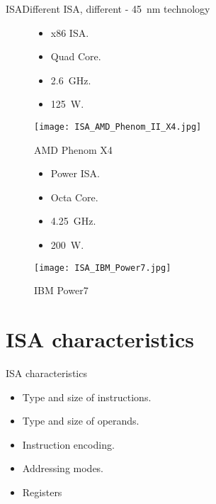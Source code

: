 \documentclass[]{slides}
\begin{document}
\begin{frame}{\acl{ISA}}{Different \ac{ISA}, different \uA - 45~nm technology}
\begin{figure}[!htb]
  \begin{minipage}{0.5\textwidth}
    \centering
    \begin{itemize}
      \item x86 \ac{ISA}.
      \item Quad Core.
      \item 2.6~GHz.
      \item 125~W.
    \end{itemize}
    \texttt{[image: ISA\_AMD\_Phenom\_II\_X4.jpg]}
    \caption{AMD Phenom X4}
    \label{Figure:AMD_Phenom_X4b}
  \end{minipage}%
  \begin{minipage}{0.50\textwidth}
    \centering
    \begin{itemize}
      \item Power \ac{ISA}.
      \item Octa Core.
      \item 4.25~GHz.
      \item 200~W.
    \end{itemize}
    \texttt{[image: ISA\_IBM\_Power7.jpg]}
    \caption{IBM Power7}
    \label{Figure:IBM_Power}
  \end{minipage}
\end{figure}
\end{frame}

\section{\acs{ISA} characteristics}
\begin{frame}{\acs{ISA} characteristics}{}
  \begin{itemize}
    \item Type and size of instructions.
    \item Type and size of operands.
    \item Instruction encoding.
    \item Addressing modes.    
    \item Registers
  \end{itemize}
\end{frame}

\end{document}
